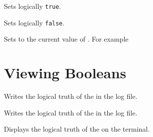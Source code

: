 \documentclass[oneside]{book}
\begin{document}
\begin{function}{\BoolSetTrue}
\begin{syntax}
 
\end{syntax}
Sets  logically \texttt{true}.
\end{function}

\begin{function}{\BoolSetFalse}
\begin{syntax}
 
\end{syntax}
Sets  logically \texttt{false}.
\end{function}

\begin{function}{\BoolSetEq}
\begin{syntax}
  
\end{syntax}
Sets  to the current value of .
For example
\begin{codehigh}
\BoolSetTrue \lTmpaBool
\BoolSetEq \lTmpbBool \lTmpaBool
\BoolVarLog \lTmpbBool
\end{codehigh}
\end{function}

\section{Viewing Booleans}

\begin{function}{\BoolLog}
\begin{syntax}
 
\end{syntax}
Writes the logical truth of the  in the log file.
\end{function}

\begin{function}{\BoolVarLog}
\begin{syntax}
 
\end{syntax}
Writes the logical truth of the  in the log file.
\end{function}

\begin{function}{\BoolShow}
\begin{syntax}
 
\end{syntax}
Displays the logical truth of the  on the terminal.
\end{function}
\end{document}
